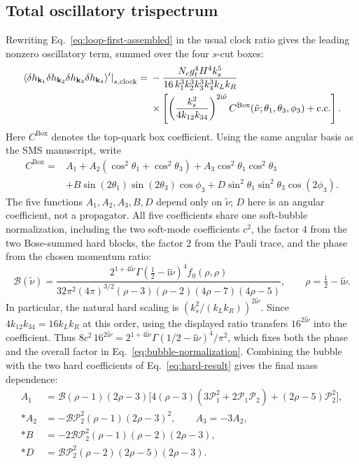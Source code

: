 \documentclass[a4paper,12pt]{article}
\newcommand{\ii}{\mathrm i}
\newcommand{\mb}{\mathbf}
\newcommand{\tn}{\tilde\nu}
\newcommand{\bk}{\mb k}
\newcommand{\cC}{C^{\mathrm{Box}}}
\begin{document}
\subsection{Total oscillatory trispectrum}
Rewriting Eq.~\eqref{eq:loop-first-assembled} in the usual clock ratio gives
the leading nonzero oscillatory term, summed over the four $s$-cut boxes:
\begin{align}
 \left.\langle\delta h_{\bk_1}\delta h_{\bk_2}\delta h_{\bk_3}\delta h_{\bk_4}\rangle'
 \right|_{s,\rm clock}
 ={}&-\frac{N_cg_t^4H^4 k_s^5}{16\,k_1^3k_2^3k_3^3k_4^3 k_Lk_R}\nonumber\\
 &\times\left[\left(\frac{k_s^2}{4k_{12}k_{34}}\right)^{2\ii\tn}
 \cC(\tn;\theta_1,\theta_3,\phi_3)+\mathrm{c.c.}\right].
 \label{eq:final}
\end{align}
Here $\cC$ denotes the top-quark box coefficient.
Using the same angular basis as the SMS manuscript, write
\begin{align}
 \cC={}&A_1+A_2(\cos^2\theta_1+\cos^2\theta_3)
 +A_3\cos^2\theta_1\cos^2\theta_3\nonumber\\
 &+B\sin(2\theta_1)\sin(2\theta_3)\cos\phi_3
 +D\sin^2\theta_1\sin^2\theta_3\cos(2\phi_3).
 \label{eq:angular-final}
\end{align}
The five functions $A_1,A_2,A_3,B,D$ depend only on $\tn$;
$D$ here is an angular coefficient, not a propagator.
All five coefficients share one soft-bubble normalization, including the two
soft-mode coefficients $c^2$, the factor $4$ from the two Bose-summed hard blocks, the factor $2$ from the Pauli trace, and the phase from the chosen momentum ratio:
\begin{equation}
 \mathcal B(\tn)=
 \frac{2^{1+4\ii\tn}\Gamma(\tfrac12-\ii\tn)^4 f_0(\rho,\rho)}
 {32\pi^2(4\pi)^{3/2}(\rho-3)(\rho-2)(4\rho-7)(4\rho-5)},\qquad
 \rho=\tfrac12-\ii\tn.
 \label{eq:bubble-normalization}
\end{equation}
In particular, the natural hard scaling is
$(k_s^2/(k_Lk_R))^{2\ii\tn}$. Since
$4k_{12}k_{34}=16k_Lk_R$ at this order, using the displayed
ratio transfers $16^{2\ii\tn}$ into the coefficient. Thus
$8c^2\,16^{2\ii\tn}
=2^{1+4\ii\tn}\Gamma(1/2-\ii\tn)^4/\pi^2$, which fixes both
the phase and the overall factor in Eq.~\eqref{eq:bubble-normalization}.
Combining the bubble with the two hard coefficients of Eq.~\eqref{eq:hard-result}
gives the final mass dependence:
\begin{align}
 A_1&=\mathcal B(\rho-1)(2\rho-3)
 \big[4(\rho-3)(3\mathcal P_1^2+2\mathcal P_1\mathcal P_2)
 +(2\rho-5)\mathcal P_2^2\big],\\*
 A_2&=-\mathcal B\mathcal P_2^2(\rho-1)(2\rho-3)^2,\qquad A_3=-3A_2,\\*
 B&=-2\mathcal B\mathcal P_2^2(\rho-1)(\rho-2)(2\rho-3),\\*
 D&=\mathcal B\mathcal P_2^2(\rho-2)(2\rho-5)(2\rho-3).
 \label{eq:compact-coefficients}
\end{align}
\end{document}
